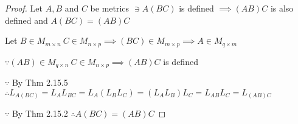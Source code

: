 \begin{proof}
	Let $A,B$ and $C$ be metrics $\ni A(BC)$ is defined $\implies (AB)C$ is also defined and $A(BC) = (AB)C$
	
	Let $B \in M_{m \times n} ~ C \in M_{n \times p} \implies (BC) \in M_{m \times p} \implies A \in M_{q \times m}$
	
	$\because (AB) \in M_{q \times n}~ C \in M_{n \times p} \implies (AB)C$ is defined
	
	$\because$ By Thm 2.15.5 $\therefore L_{A(BC)} = L_AL_{BC} = L_A(L_BL_C) = (L_AL_B)L_C = L_{AB}L_C = L_{(AB)C}$
	
	$\because$ By Thm 2.15.2 $\therefore A(BC) = (AB)C$
\end{proof}
